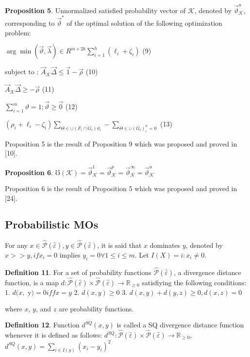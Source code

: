 \documentclass[]{iosart2c}
\begin{document}
    \textbf{Proposition 5}. Unnormalized satisfied probability vector of $\mathcal{K}$, denoted by $\vec{\vartheta}^u_\mathcal{K}$, corresponding to $\vec{\vartheta}^*$ of the optimal solution of the following optimization problem:

    $\arg \min(\vec{\vartheta},\vec{\lambda})\in R^{m \times 2h}\sum^h_{i=1}(\ell_i + \zeta_i)$ (9)

    subject to : $\vec{A}_\mathcal{K} \vec{\Delta} \le \vec{1} - \vec{\rho}$ (10)

    $\vec{A}_\mathcal{K} \vec\Delta\geq -\vec{\rho}$ (11)

    $\sum^m_{i=1} \vartheta = 1;\vec{\vartheta}\geq\vec{0}$ (12)

    $(\rho_i + \ell_i - \zeta_i)\sum_{\Theta \in \cup(F_i \cap G_i)\vartheta_i} - \sum_{\Theta\in\cup(G_i)^\vartheta_i=0}$ (13)

    Proposition 5 is the result of Proposition 9 which was proposed and proved in [10].

    \textbf{Proposition 6}. $\mho(\mathcal{K}) = \vec{\vartheta}^1_\mathcal{K} = \vec{\vartheta}^p_\mathcal{K} = \vec{\vartheta}^\infty_\mathcal{K} = \vec{\vartheta}^u_\mathcal{K}$

    Proposition 6 is the result of Proposition 5 which was proposed and proved in [24].

    \subsection{Probabilistic MOs}

    For any $x \in \hat{\mathcal{P}}(\hat{\varepsilon}), y \in \hat{\mathcal{P}}(\hat{\varepsilon})$, it is said that $x$ dominates $y$, denoted by $x >> y, if x_i = 0$ implies $y_i = 0 \forall 1 \le i \le m$. Let $I(X) = {i : x_i \neq 0}$.

    \textbf{Definition 11}. For a set of probability functions $\hat{\mathcal{P}} (\hat{\varepsilon})$, a divergence distance function, is a map $d : \hat{\mathcal{P}} (\hat{\varepsilon}) \times \hat{\mathcal{P}} (\hat{\varepsilon}) \to \mathbb{R}_{\geq0}$ satisfiying the following conditions:
    1. $d(x,$ y$) = 0 iff x = y$
    2. $d(x, y) \geq 0$
    3. $d(x, y) + d(y, z)\ge0, d(x, z) = 0$

    where $x$, $y$, and $z$ are probability functions.

    \textbf{Definition 12}. Function $d^{SQ}(x, y)$ is called a SQ divergence distance function whenever it is defined as follows: $d^{SQ} : \hat{\mathcal{P}} (\hat{\varepsilon}) \times \hat{\mathcal{P}} (\hat{\varepsilon}) \to \mathbb{R}_{\geq0}$, $d^{SQ}(x, y) = \sum_{i \in I(y)} (x_i - y_i)^2$
\end{document}
